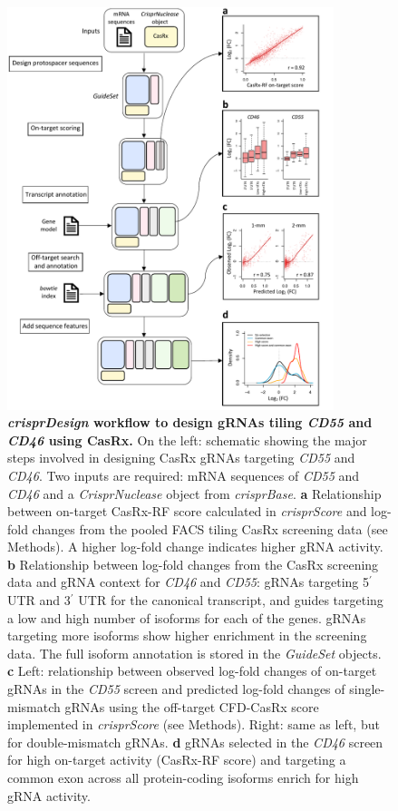 \documentclass[pdftex,english,10pt]{article}
\begin{document}
\begin{figure}
\centering
\includegraphics[width=0.85\textwidth]{analyses/casrx/sanjana/figures/casrx.pdf}
  \caption{\textbf{\textit{crisprDesign} workflow to design gRNAs tiling \textit{CD55} and \textit{CD46} using CasRx.} 
  On the left: schematic showing the major steps involved in designing CasRx gRNAs targeting \textit{CD55} and \textit{CD46}.
Two inputs are required: mRNA sequences of \textit{CD55} and \textit{CD46} and a 
\textit{CrisprNuclease} object from \textit{crisprBase}. 
\textbf{a} Relationship between on-target CasRx-RF score calculated in \textit{crisprScore} and log-fold changes from the pooled FACS tiling CasRx screening data (see Methods). A higher log-fold change indicates higher gRNA activity.
\textbf{b} Relationship between log-fold changes from the CasRx screening data and gRNA context for \textit{CD46} and \textit{CD55}: gRNAs targeting 5$^\prime$ UTR and 3$^\prime$ UTR for the canonical transcript, and guides targeting a low and high number of isoforms for each of the genes. gRNAs targeting more isoforms show higher enrichment in the screening data. The full isoform annotation is stored in the \textit{GuideSet} objects.
\textbf{c} Left: relationship between observed log-fold changes of on-target gRNAs in the \textit{CD55} screen and predicted log-fold changes of single-mismatch gRNAs using the off-target CFD-CasRx score implemented in \textit{crisprScore} (see Methods). Right: same as left, but for double-mismatch gRNAs.
\textbf{d} gRNAs selected in the \textit{CD46} screen for high on-target activity (CasRx-RF score) and targeting a common exon across all protein-coding isoforms enrich for high gRNA activity. }
  \label{fig:casrx}
\end{figure}
\end{document}
